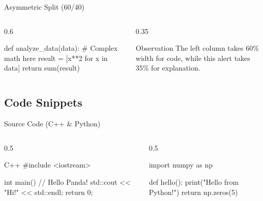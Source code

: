\begin{frame}[fragile]{Asymmetric Split (60/40)}
    \begin{columns}[c] %
        \begin{column}{0.6\textwidth}
            \begin{pycode}[title=Processing Logic]
def analyze_data(data):
    # Complex math here
    result = [x**2 for x in data]
    return sum(result)
            \end{pycode}
        \end{column}
        
        \begin{column}{0.35\textwidth}
            \begin{palert}{Observation}
                The left column takes 60\% width for code, while this alert takes 35\% for explanation.
            \end{palert}
        \end{column}
    \end{columns}
\end{frame}

\subsection{Code Snippets}

\begin{frame}[fragile]{Source Code (C++ \& Python)}
    \begin{columns}
        \begin{column}{0.5\textwidth}
            \begin{codeblock}[title=main.cpp]{C++}
#include <iostream>

int main() {
    // Hello Panda!
    std::cout << "Hi!" << std::endl;
    return 0;
}
            \end{codeblock}
        \end{column}
        \begin{column}{0.5\textwidth}
            \begin{pycode}[caption=Python Snippet]
import numpy as np

def hello():
    print("Hello from Python!")
    return np.zeros(5)
            \end{pycode}
        \end{column}
    \end{columns}
\end{frame}
